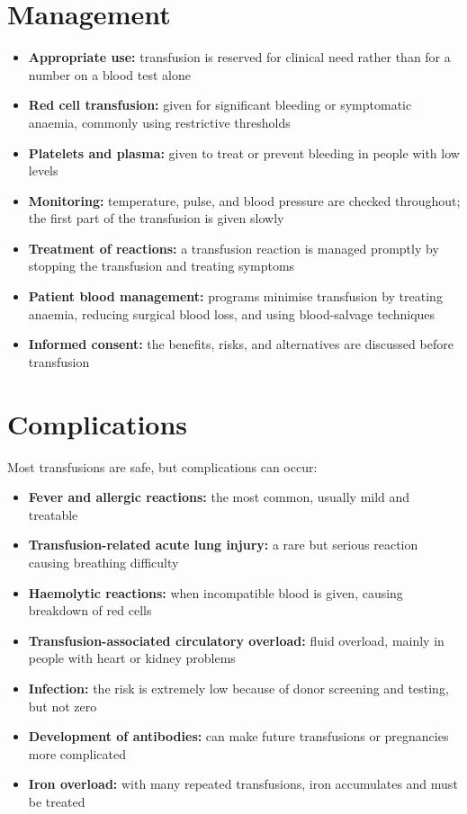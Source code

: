 \section*{Management}
\begin{itemize}
    \item \textbf{Appropriate use:} transfusion is reserved for clinical need rather than for a number on a blood test alone
    \item \textbf{Red cell transfusion:} given for significant bleeding or symptomatic anaemia, commonly using restrictive thresholds
    \item \textbf{Platelets and plasma:} given to treat or prevent bleeding in people with low levels
    \item \textbf{Monitoring:} temperature, pulse, and blood pressure are checked throughout; the first part of the transfusion is given slowly
    \item \textbf{Treatment of reactions:} a transfusion reaction is managed promptly by stopping the transfusion and treating symptoms
    \item \textbf{Patient blood management:} programs minimise transfusion by treating anaemia, reducing surgical blood loss, and using blood-salvage techniques
    \item \textbf{Informed consent:} the benefits, risks, and alternatives are discussed before transfusion
\end{itemize}

\section*{Complications}
Most transfusions are safe, but complications can occur:

\begin{itemize}
    \item \textbf{Fever and allergic reactions:} the most common, usually mild and treatable
    \item \textbf{Transfusion-related acute lung injury:} a rare but serious reaction causing breathing difficulty
    \item \textbf{Haemolytic reactions:} when incompatible blood is given, causing breakdown of red cells
    \item \textbf{Transfusion-associated circulatory overload:} fluid overload, mainly in people with heart or kidney problems
    \item \textbf{Infection:} the risk is extremely low because of donor screening and testing, but not zero
    \item \textbf{Development of antibodies:} can make future transfusions or pregnancies more complicated
    \item \textbf{Iron overload:} with many repeated transfusions, iron accumulates and must be treated
\end{itemize}


